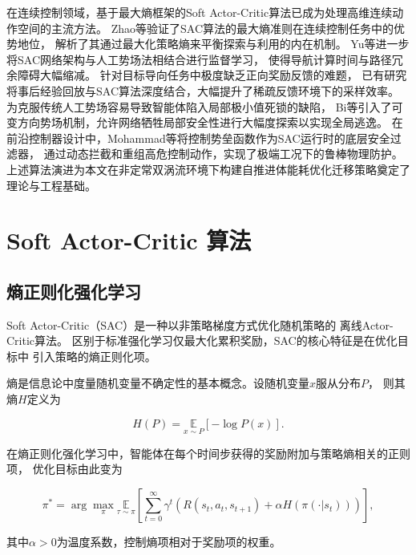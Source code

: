 在连续控制领域，基于最大熵框架的Soft Actor-Critic算法已成为处理高维连续动作空间的主流方法。
Zhao等验证了SAC算法的最大熵准则在连续控制任务中的优势地位，
解析了其通过最大化策略熵来平衡探索与利用的内在机制\cite{zhaoSACPathPlanning2023}。
Yu等进一步将SAC网络架构与人工势场法相结合进行监督学习，
使得导航计算时间与路径冗余障碍大幅缩减\cite{yuSoftActorcriticCombining2025}。
针对目标导向任务中极度缺乏正向奖励反馈的难题，
已有研究将事后经验回放与SAC算法深度结合，大幅提升了稀疏反馈环境下的采样效率\cite{zhaoSACPathPlanning2023}。
为克服传统人工势场容易导致智能体陷入局部极小值死锁的缺陷，
Bi等引入了可变方向势场机制，允许网络牺牲局部安全性进行大幅度探索以实现全局逃逸\cite{biVDPFPathPlanning2025}。
在前沿控制器设计中，Mohammad等将控制势垒函数作为SAC运行时的底层安全过滤器，
通过动态拦截和重组高危控制动作，实现了极端工况下的鲁棒物理防护\cite{mohammadCBFSAC2025}。
上述算法演进为本文在非定常双涡流环境下构建自推进体能耗优化迁移策略奠定了理论与工程基础。
\section{Soft Actor-Critic 算法}

\subsection{熵正则化强化学习}

Soft Actor-Critic（SAC）是一种以非策略梯度方式优化随机策略的
离线Actor-Critic算法。
区别于标准强化学习仅最大化累积奖励，SAC的核心特征是在优化目标中
引入策略的熵正则化项。

熵是信息论中度量随机变量不确定性的基本概念。设随机变量$x$服从分布$P$，
则其熵$H$定义为

\begin{equation}
    H(P) = \underset{x \sim P}{\mathbb{E}}\left[-\log P(x)\right].
    \label{eq:entropy_def}
\end{equation}

在熵正则化强化学习中，智能体在每个时间步获得的奖励附加与策略熵相关的正则项，
优化目标由此变为

\begin{equation}
    \pi^{*} = \arg\max_{\pi} \underset{\tau \sim \pi}{\mathbb{E}}\left[
        \sum_{t=0}^{\infty} \gamma^{t}
        \left(R(s_t, a_t, s_{t+1}) + \alpha H(\pi(\cdot | s_t))\right)
    \right],
    \label{eq:entropy_rl_obj}
\end{equation}

其中$\alpha > 0$为温度系数，控制熵项相对于奖励项的权重。


